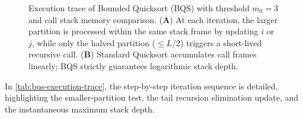 \begin{figure}[H]
  \caption{Execution trace of Bounded Quicksort (BQS) with threshold $m_0=3$ and call stack memory comparison. (\textbf{A}) At each iteration, the larger partition is processed within the same stack frame by updating $i$ or $j$, while only the halved partition ($\le L/2$) triggers a short-lived recursive call. (\textbf{B}) Standard Quicksort accumulates call frames linearly; BQS strictly guarantees logarithmic stack depth.}
  \label{fig:bqs-trace-and-stack}
\end{figure}

In \autoref{tab:bqs-execution-trace}, the step-by-step iteration sequence is detailed, highlighting the smaller-partition test, the tail recursion elimination update, and the instantaneous maximum stack depth.

